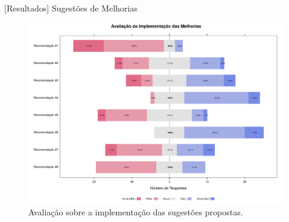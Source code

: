 \documentclass[t,14pt,mathserif]{beamer}
\begin{document}
\begin{frame}{[Resultados] Sugestões de Melhorias}

\begin{figure}[htpb]
    \centering
    \includegraphics[width=.9\linewidth]{../img/plot_likert_avaliacao_implementacao_melhorias.pdf}
    \caption{Avaliação sobre a implementação das sugestões propostas.}
\label{fig:plot_likert_avaliacao_implementacao_melhorias}
\end{figure}

\end{frame}
\end{document}
